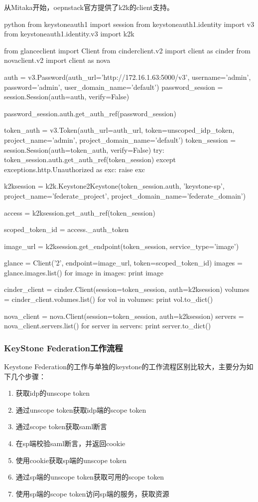 从Mitaka开始，oepnstack官方提供了k2k的client支持。
\begin{code-block}{python}
from keystoneauth1 import session
from keystoneauth1.identity import v3
from keystoneauth1.identity.v3 import k2k

from glanceclient import Client
from cinderclient.v2 import client as cinder
from novaclient.v2 import client as nova

auth = v3.Password(auth_url='http://172.16.1.63:5000/v3',
                   username='admin',
                   password='admin',
                   user_domain_name='default')
password_session = session.Session(auth=auth, verify=False)

password_session.auth.get_auth_ref(password_session)

token_auth = v3.Token(auth_url=auth_url, token=unscoped_idp_token,
                      project_name='admin',
                      project_domain_name='default')
token_session = session.Session(auth=token_auth, verify=False)
try:
    token_session.auth.get_auth_ref(token_session)
except exceptions.http.Unauthorized as exc:
    raise exc

k2ksession = k2k.Keystone2Keystone(token_session.auth,
    'keystone-sp', project_name='federate_project',
    project_domain_name='federate_domain')

access = k2ksession.get_auth_ref(token_session)

scoped_token_id = access._auth_token

image_url = k2ksession.get_endpoint(token_session,
                                    service_type='image')

glance = Client('2', endpoint=image_url, token=scoped_token_id)
images = glance.images.list()
for image in images:
    print image

cinder_client = cinder.Client(session=token_session, auth=k2ksession)
volumes = cinder_client.volumes.list()
for vol in volumes:
    print vol.to_dict()

nova_client = nova.Client(session=token_session, auth=k2ksession)
servers = nova_client.servers.list()
for server in servers:
    print server.to_dict()
\end{code-block}

\subsubsection{KeyStone Federation工作流程}
Keystone Federation的工作与单独的keystone的工作流程区别比较大，主要分为如下几个步骤：
\begin{enumerate}
  \item 获取idp的unscope token
  \item 通过unscope token获取idp端的scope token
  \item 通过scope token获取saml断言
  \item 在sp端校验saml断言，并返回cookie
  \item 使用cookie获取sp端的unscope token
  \item 通过sp端的unscope token获取可用的scope token
  \item 使用sp端的scope token访问sp端的服务，获取资源
\end{enumerate}


